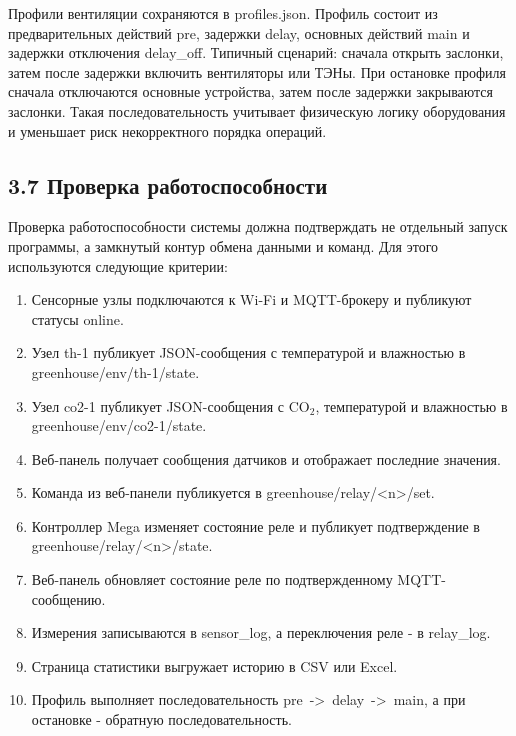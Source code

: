 \documentclass[a4paper,14pt]{extarticle}
\renewcommand{\texttt}[1]{\textnormal{#1}}
\providecommand{\tightlist}{%
  \setlength{\itemsep}{0pt}\setlength{\parskip}{0pt}}
\begin{document}
Профили вентиляции сохраняются в \texttt{profiles.json}. Профиль состоит
из предварительных действий \texttt{pre}, задержки \texttt{delay},
основных действий \texttt{main} и задержки отключения
\texttt{delay\_off}. Типичный сценарий: сначала открыть заслонки, затем
после задержки включить вентиляторы или ТЭНы. При остановке профиля
сначала отключаются основные устройства, затем после задержки
закрываются заслонки. Такая последовательность учитывает физическую
логику оборудования и уменьшает риск некорректного порядка операций.

\subsection{3.7 Проверка
работоспособности}\label{ux43fux440ux43eux432ux435ux440ux43aux430-ux440ux430ux431ux43eux442ux43eux441ux43fux43eux441ux43eux431ux43dux43eux441ux442ux438}

Проверка работоспособности системы должна подтверждать не отдельный
запуск программы, а замкнутый контур обмена данными и команд. Для этого
используются следующие критерии:

\begin{enumerate}
\def\labelenumi{\arabic{enumi})}
\tightlist
\item
  Сенсорные узлы подключаются к Wi-Fi и MQTT-брокеру и публикуют статусы
  \texttt{online}.
\item
  Узел \texttt{th-1} публикует JSON-сообщения с температурой и
  влажностью в \texttt{greenhouse/env/th-1/state}.
\item
  Узел \texttt{co2-1} публикует JSON-сообщения с CO\(_2\), температурой
  и влажностью в \texttt{greenhouse/env/co2-1/state}.
\item
  Веб-панель получает сообщения датчиков и отображает последние
  значения.
\item
  Команда из веб-панели публикуется в
  \texttt{greenhouse/relay/\textless{}n\textgreater{}/set}.
\item
  Контроллер Mega изменяет состояние реле и публикует подтверждение в
  \texttt{greenhouse/relay/\textless{}n\textgreater{}/state}.
\item
  Веб-панель обновляет состояние реле по подтвержденному MQTT-сообщению.
\item
  Измерения записываются в \texttt{sensor\_log}, а переключения реле - в
  \texttt{relay\_log}.
\item
  Страница статистики выгружает историю в CSV или Excel.
\item
  Профиль выполняет последовательность
  \texttt{pre\ -\textgreater{}\ delay\ -\textgreater{}\ main}, а при
  остановке - обратную последовательность.
\end{enumerate}
\end{document}
